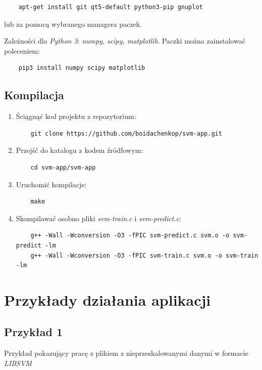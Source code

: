 \documentclass[paper=a4, fontsize=11pt]{scrartcl} %
\numberwithin{equation}{section} %
\numberwithin{figure}{section} %
\begin{document}
    \begin{verbatim}
    apt-get install git qt5-default python3-pip gnuplot
    \end{verbatim} 

    lub za pomocą wybranego managera paczek.

    \par Zależności dla \textit{Python 3}: \textit{numpy, scipy, matplotlib}. Paczki można
    zainstalować poleceniem:

    \begin{verbatim}
    pip3 install numpy scipy matplotlib
    \end{verbatim} 

\subsection{Kompilacja}
    \begin{enumerate}
        \item Ściągnąć kod projektu z repozytorium:
        \begin{verbatim}
    git clone https://github.com/boidachenkop/svm-app.git
        \end{verbatim} 

        \item Przejść do katalogu z kodem źródłowym: 
        \begin{verbatim}
    cd svm-app/svm-app
        \end{verbatim} 

        \item Uruchomić kompilacje:
        \begin{verbatim}
    make
        \end{verbatim} 

        \item Skompilawać osobno pliki \textit{svm-train.c} i \textit{svm-predict.c}:
        \begin{verbatim}
    g++ -Wall -Wconversion -O3 -fPIC svm-predict.c svm.o -o svm-predict -lm
    g++ -Wall -Wconversion -O3 -fPIC svm-train.c svm.o -o svm-train -lm
        \end{verbatim} 

    \end{enumerate}

\newpage
\section{Przykłady działania aplikacji} %
\subsection{Przykład 1}
    \par Przykład pokazujący pracę z plikiem z nieprzeskalowanymi danymi w formacie
    \textit{LIBSVM}
\end{document}
